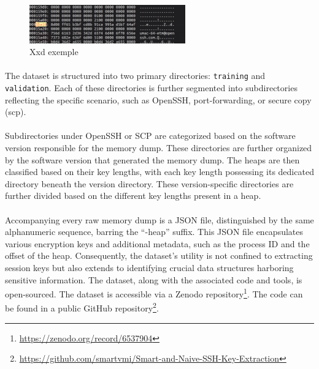 {        \begin{figure}[H]
            \centering
            \includegraphics[width=0.6\textwidth]{img/background/xxd.png}
            \caption{Xxd exemple}
            \label{fig:Background:xxd}
        \end{figure}

        \paragraph{}The dataset is structured into two primary directories: \texttt{training} and \texttt{validation}. Each of these directories is further segmented into subdirectories reflecting the specific scenario, such as OpenSSH, port-forwarding, or secure copy (\acrshort{scp}).

        \paragraph{}Subdirectories under OpenSSH or SCP are categorized based on the software version responsible for the memory dump. These directories are further organized by the software version that generated the memory dump. The heaps are then classified based on their key lengths, with each key length possessing its dedicated directory beneath the version directory. These version-specific directories are further divided based on the different key lengths present in a heap.

        \paragraph{}Accompanying every raw memory dump is a JSON file, distinguished by the same alphanumeric sequence, barring the ``-heap'' suffix. This JSON file encapsulates various encryption keys and additional metadata, such as the process ID and the offset of the heap. Consequently, the dataset's utility is not confined to extracting session keys but also extends to identifying crucial data structures harboring sensitive information. The dataset, along with the associated code and tools, is open-sourced. The dataset is accessible via a Zenodo repository\footnote{\url{https://zenodo.org/record/6537904}}. The code can be found in a public GitHub repository\footnote{\url{https://github.com/smartvmi/Smart-and-Naive-SSH-Key-Extraction}}.}
        
